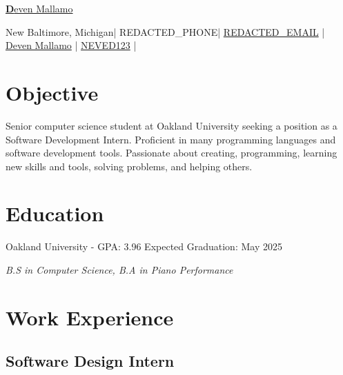 \documentclass{article}
\newcommand{\resumesection}[1]{
	\section*{\Large\textbf{#1}}
	\hrulefill
	\vspace{1ex}
}
\newcommand{\name}{Deven Mallamo}
\newcommand{\address}{New Baltimore, Michigan}
\newcommand{\phone}{REDACTED_PHONE}
\newcommand{\email}{REDACTED_EMAIL}
\newcommand{\linkedin}{Deven Mallamo}
\newcommand{\github}{NEVED123}
\begin{document}
\begin{tcolorbox}[colback= boxfill,colframe=boxframe]
	\begin{center}
		\vspace{5pt}
		\href{https://devenmallamo.com}{\Huge \textbf \name} 

		\normalsize \vspace{10pt}

		\faHome \space \address \space | 
		\faPhone \space \phone \space |
		\href{mailto:\email}{\faEnvelope \space \email} \space | 
		\href{https://www.linkedin.com/in/deven-mallamo/}{\faLinkedin \space \linkedin} \space | 
		\href{https://github.com/NEVED123}{\faGithub \space \github} |
	\end{center}
\end{tcolorbox}

\vspace{1ex}

\resumesection{Objective}

\vspace{.2ex}	

Senior computer science student at Oakland University seeking a position as a Software Development Intern. Proficient in many programming languages and software development tools. Passionate about creating, programming, learning new skills and tools, solving problems, and helping others.

\vspace{.5ex}	


\resumesection{Education}

\vspace{.2ex}	

Oakland University - GPA: 3.96 \hfill Expected Graduation: May 2025

\textit {B.S in Computer Science, B.\hspace{49152sp}A in Piano Performance} 

\vspace{.5ex}


\resumesection{Work Experience}

\subsection*{Software Design Intern} 
\end{document}
